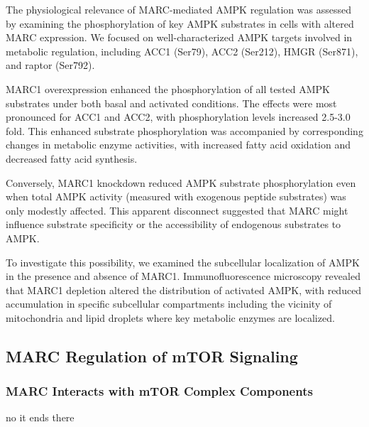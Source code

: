 \documentclass[11pt,a4paper]{article}
\begin{document}
The physiological relevance of MARC-mediated AMPK regulation was assessed by examining the phosphorylation of key AMPK substrates in cells with altered MARC expression. We focused on well-characterized AMPK targets involved in metabolic regulation, including ACC1 (Ser79), ACC2 (Ser212), HMGR (Ser871), and raptor (Ser792).

MARC1 overexpression enhanced the phosphorylation of all tested AMPK substrates under both basal and activated conditions. The effects were most pronounced for ACC1 and ACC2, with phosphorylation levels increased 2.5-3.0 fold. This enhanced substrate phosphorylation was accompanied by corresponding changes in metabolic enzyme activities, with increased fatty acid oxidation and decreased fatty acid synthesis.

Conversely, MARC1 knockdown reduced AMPK substrate phosphorylation even when total AMPK activity (measured with exogenous peptide substrates) was only modestly affected. This apparent disconnect suggested that MARC might influence substrate specificity or the accessibility of endogenous substrates to AMPK.

To investigate this possibility, we examined the subcellular localization of AMPK in the presence and absence of MARC1. Immunofluorescence microscopy revealed that MARC1 depletion altered the distribution of activated AMPK, with reduced accumulation in specific subcellular compartments including the vicinity of mitochondria and lipid droplets where key metabolic enzymes are localized.

\subsection{MARC Regulation of mTOR Signaling}

\subsubsection{MARC Interacts with mTOR Complex Components}

no it ends there
\end{document}
